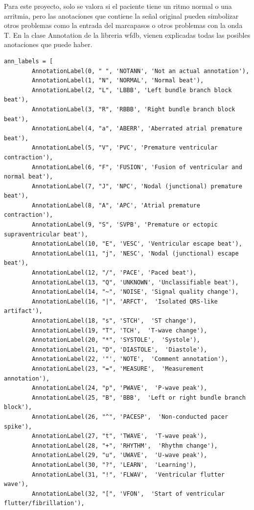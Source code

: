 Para este proyecto, solo se valora si el paciente tiene un ritmo normal o una arritmia, pero las anotaciones
que contiene la señal original pueden simbolizar otros problemas como la entrada del marcapasos o otros problemas con la onda T.
En la clase Annotation de la libreria wfdb, vienen explicadas todas las posibles anotaciones que puede haber.
\lstset{language=python, breaklines=true, basicstyle=\footnotesize}
\begin{lstlisting}[frame=single]
    ann_labels = [
        AnnotationLabel(0, " ", 'NOTANN', 'Not an actual annotation'),
        AnnotationLabel(1, "N", 'NORMAL', 'Normal beat'),
        AnnotationLabel(2, "L", 'LBBB', 'Left bundle branch block beat'),
        AnnotationLabel(3, "R", 'RBBB', 'Right bundle branch block beat'),
        AnnotationLabel(4, "a", 'ABERR', 'Aberrated atrial premature beat'),
        AnnotationLabel(5, "V", 'PVC', 'Premature ventricular contraction'),
        AnnotationLabel(6, "F", 'FUSION', 'Fusion of ventricular and normal beat'),
        AnnotationLabel(7, "J", 'NPC', 'Nodal (junctional) premature beat'),
        AnnotationLabel(8, "A", 'APC', 'Atrial premature contraction'),
        AnnotationLabel(9, "S", 'SVPB', 'Premature or ectopic supraventricular beat'),
        AnnotationLabel(10, "E", 'VESC', 'Ventricular escape beat'),
        AnnotationLabel(11, "j", 'NESC', 'Nodal (junctional) escape beat'),
        AnnotationLabel(12, "/", 'PACE', 'Paced beat'),
        AnnotationLabel(13, "Q", 'UNKNOWN', 'Unclassifiable beat'),
        AnnotationLabel(14, "~", 'NOISE', 'Signal quality change'),
        AnnotationLabel(16, "|", 'ARFCT',  'Isolated QRS-like artifact'),
        AnnotationLabel(18, "s", 'STCH',  'ST change'),
        AnnotationLabel(19, "T", 'TCH',  'T-wave change'),
        AnnotationLabel(20, "*", 'SYSTOLE',  'Systole'),
        AnnotationLabel(21, "D", 'DIASTOLE',  'Diastole'),
        AnnotationLabel(22, '"', 'NOTE',  'Comment annotation'),
        AnnotationLabel(23, "=", 'MEASURE',  'Measurement annotation'),
        AnnotationLabel(24, "p", 'PWAVE',  'P-wave peak'),
        AnnotationLabel(25, "B", 'BBB',  'Left or right bundle branch block'),
        AnnotationLabel(26, "^", 'PACESP',  'Non-conducted pacer spike'),
        AnnotationLabel(27, "t", 'TWAVE',  'T-wave peak'),
        AnnotationLabel(28, "+", 'RHYTHM',  'Rhythm change'),
        AnnotationLabel(29, "u", 'UWAVE',  'U-wave peak'),
        AnnotationLabel(30, "?", 'LEARN',  'Learning'),
        AnnotationLabel(31, "!", 'FLWAV',  'Ventricular flutter wave'),
        AnnotationLabel(32, "[", 'VFON',  'Start of ventricular flutter/fibrillation'),

\end{lstlisting}
